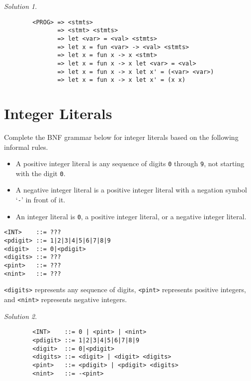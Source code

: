 \documentclass{article}
\theoremstyle{remark} \newtheorem*{solution}{Solution}
\begin{document}
\begin{solution}
\indent
    \begin{lstlisting}
        <PROG> => <stmts>
               => <stmt> <stmts>
               => let <var> = <val> <stmts>
               => let x = fun <var> -> <val> <stmts>
               => let x = fun x -> x <stmt>
               => let x = fun x -> x let <var> = <val>
               => let x = fun x -> x let x' = (<var> <var>)
               => let x = fun x -> x let x' = (x x)
    \end{lstlisting}
\end{solution}



\pagebreak
\section{Integer Literals}

Complete the BNF grammar below for integer literals based on the following informal rules.
\begin{itemize}
\item A positive integer literal is any sequence of digits \texttt{0} through \texttt{9}, not starting with the digit \texttt{0}.
\item A negative integer literal is a positive integer literal with a negation symbol `\texttt{-}' in front of it.
\item An integer literal is \texttt{0}, a positive integer literal, or a negative integer literal.
\end{itemize}

\begin{lstlisting}
<INT>    ::= ???
<pdigit> ::= 1|2|3|4|5|6|7|8|9
<digit>  ::= 0|<pdigit>
<digits> ::= ???
<pint>   ::= ???
<nint>   ::= ???
\end{lstlisting}
\texttt{<digits>} represents any sequence of digits, \texttt{<pint>}
represents positive integers, and \texttt{<nint>} represents negative
integers.

\begin{solution}
\indent
    \begin{lstlisting}
        <INT>    ::= 0 | <pint> | <nint>
        <pdigit> ::= 1|2|3|4|5|6|7|8|9
        <digit>  ::= 0|<pdigit>
        <digits> ::= <digit> | <digit> <digits>
        <pint>   ::= <pdigit> | <pdigit> <digits>
        <nint>   ::= -<pint>
    \end{lstlisting}
\end{solution}
\end{document}
